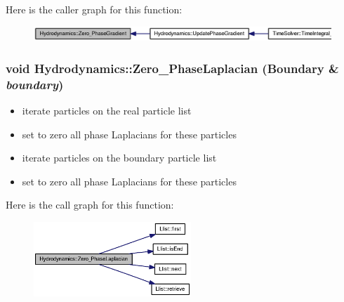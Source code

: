 Here is the caller graph for this function:\nopagebreak
\begin{figure}[H]
\begin{center}
\leavevmode
\includegraphics[width=365pt]{classHydrodynamics_3c9019f19ccac5370b7b0ccda343b5d2_icgraph}
\end{center}
\end{figure}
\hypertarget{classHydrodynamics_d1c5fd5b500eacb886a72f2dab13e91b}{
\subsubsection[{Zero\_\-PhaseLaplacian}]{\setlength{\rightskip}{0pt plus 5cm}void Hydrodynamics::Zero\_\-PhaseLaplacian ({\bf Boundary} \& {\em boundary})}}
\label{classHydrodynamics_d1c5fd5b500eacb886a72f2dab13e91b}




\begin{itemize}
\item iterate particles on the real particle list\end{itemize}


\begin{itemize}
\item set to zero all phase Laplacians for these particles\end{itemize}


\begin{itemize}
\item iterate particles on the boundary particle list\end{itemize}


\begin{itemize}
\item set to zero all phase Laplacians for these particles \end{itemize}


Here is the call graph for this function:\nopagebreak
\begin{figure}[H]
\begin{center}
\leavevmode
\includegraphics[width=168pt]{classHydrodynamics_d1c5fd5b500eacb886a72f2dab13e91b_cgraph}
\end{center}
\end{figure}


